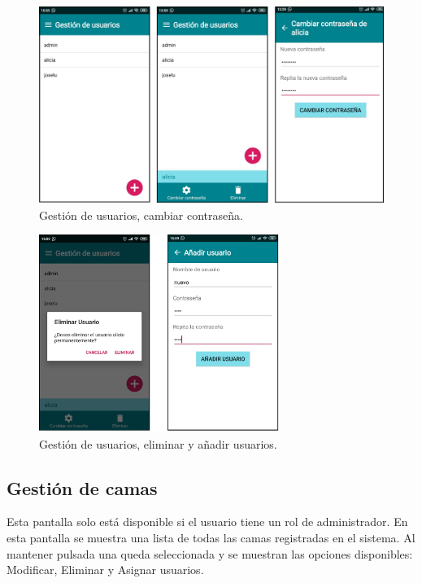 \begin{figure}[H]
	\centering
	\includegraphics[width=1\textwidth]{../img/gestiondeusuarios.png}
	\caption{Gestión de usuarios, cambiar contraseña.}
	\label{fig:gestiondeusuarios}
\end{figure}

\begin{figure}[H]
	\centering
	\includegraphics[width=0.7\textwidth]{../img/eliminaranadir.png}
	\caption{Gestión de usuarios, eliminar y añadir usuarios.}
	\label{fig:eliminaranadir}
\end{figure}

\subsection{Gestión de camas}

Esta pantalla solo está disponible si el usuario tiene un rol de administrador. En esta pantalla se muestra una lista de todas las camas registradas en el sistema. Al mantener pulsada una queda seleccionada y se muestran las opciones disponibles: Modificar, Eliminar y Asignar usuarios.  

